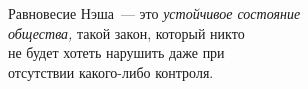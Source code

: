 \begin{frame} 
	Равновесие Нэша~— это {\it устойчивое состояние\\
	общества,} такой закон, который никто\\
	не будет хотеть нарушить даже при\\
	отсутствии какого-либо контроля.
\end{frame}
